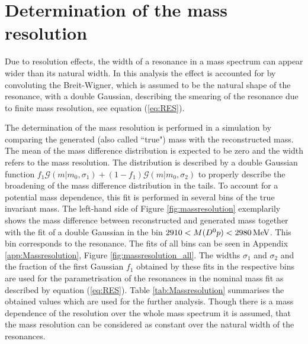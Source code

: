 \section{Determination of the mass resolution}
\label{sec:Massresolution}
Due to resolution effects, the width of a resonance in a mass spectrum can appear wider than its natural width.
In this analysis the effect is accounted for by convoluting the Breit-Wigner, which is assumed to be the natural shape of the resonance, with a double Gaussian, describing the smearing of the resonance due to finite mass resolution, see equation (\ref{eq:RES}).

The determination of the mass resolution is performed in a simulation by comparing the generated (also called ``true") mass with the reconstructed mass.
The mean of the mass difference distribution is expected to be zero and the width refers to the mass resolution.
The distribution is described by a double Gaussian function $f_1 \mathcal{G}(m|m_0,\sigma_1) + (1-f_1) \mathcal{G}(m|m_0,\sigma_2)$ to properly describe the broadening of the mass difference distribution in the tails.
To account for a potential mass dependence, this fit is performed in several bins of the true invariant \Dz\proton mass.
The left-hand side of Figure \ref{fig:massresolution} exemplarily shows the mass difference between reconstructed and generated mass together with the fit of a double Gaussian in the bin $2910 < M({{D}^0}{p}) < 2980 \mathrm{\,Me\kern -0.1em V}$.
This bin corresponds to the \LcResII resonance.
The fits of all bins can be seen in Appendix \ref{app:Massresolution}, Figure \ref{fig:massresolution_all}.
The widths $\sigma_1$ and $\sigma_2$ and the fraction of the first Gaussian $f_1$ obtained by these fits in the respective bins are used for the parametrisation of the resonances in the nominal \Dz\proton mass fit as described by equation (\ref{eq:RES}).
Table \ref{tab:Massresolution} summarises the obtained values which are used for the further analysis.
Though there is a mass dependence of the resolution over the whole \Dz\proton mass spectrum it is assumed, that the mass resolution can be considered as constant over the natural width of the resonances.
